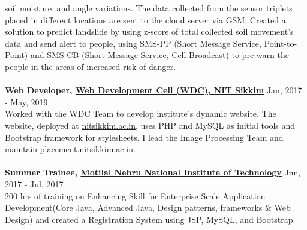 \documentclass[margin, centered]{res}
\begin{document}
\begin{resume}
            soil moisture, and angle variations. The data collected from the sensor triplets placed in different
            locations are sent to the cloud server via GSM. Created a solution to predict landslide by using z-score
            of total collected soil movement’s data and send alert to people, using SMS-PP (Short Message Service,
            Point-to-Point) and SMS-CB (Short Message Service, Cell Broadcast) to pre-warn the people in the areas
            of increased risk of danger. \\
            \\
            \textbf{Web Developer, \href{https://nitsikkim.ac.in/webdevelopmentcell}{Web Development Cell (WDC), NIT Sikkim}} \hfill Jan, 2017 - May, 2019 \\
            Worked with the WDC Team to develop institute's dynamic website. The website, deployed at
            \href{https://www.nitsikkim.ac.in}{nitsikkim.ac.in}, uses PHP and MySQL as initial tools
            and Bootstrap framework for stylesheets. I lead the Image Processing Team and maintain
            \href{https://placement.nitsikkim.ac.in}{placement.nitsikkim.ac.in}. \\
            \\
            \textbf{Summer Trainee, \href{http://www.mnnit.ac.in/}{Motilal Nehru National Institute of Technology}} \hfill Jun, 2017 - Jul, 2017 \\
            200 hrs of training on Enhancing Skill for Enterprise Scale Application Development(Core
            Java, Advanced Java, Design patterns, frameworks \& Web Design) and created a Registration
            System using JSP, MySQL, and Bootstrap.



\end{resume}
\end{document}
